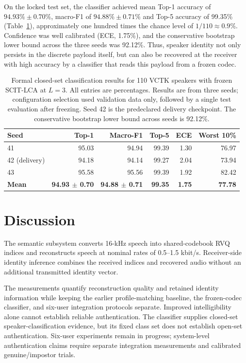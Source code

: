 \documentclass[final,5p,times,twocolumn]{elsarticle}
\begin{document}
On the locked test set, the classifier achieved mean Top-1 accuracy of $94.93\%\pm0.70\%$, macro-F1 of $94.88\%\pm0.71\%$ and Top-5 accuracy of 99.35\% (Table~\ref{tab:speaker}), approximately one hundred times the chance level of $1/110\approx0.9\%$. Confidence was well calibrated (ECE, 1.75\%), and the conservative bootstrap lower bound across the three seeds was 92.12\%. Thus, speaker identity not only persists in the discrete payload itself, but can also be recovered at the receiver with high accuracy by a classifier that reads this payload from a frozen codec.

\begin{table}[t]
\centering
\caption{Formal closed-set classification results for 110 VCTK speakers with frozen SCIT-LCA at $L=3$. All entries are percentages. Results are from three seeds; configuration selection used validation data only, followed by a single test evaluation after freezing. Seed 42 is the predeclared delivery checkpoint. The conservative bootstrap lower bound across seeds is 92.12\%.}
\label{tab:speaker}
\scriptsize\setlength{\tabcolsep}{2pt}
\begin{tabular}{lrrrrr}
\toprule
Seed & Top-1 & Macro-F1 & Top-5 & ECE & Worst 10\%\\
\midrule
41 & 95.03 & 94.94 & 99.39 & 1.30 & 76.97\\
42 (delivery) & 94.18 & 94.14 & 99.27 & 2.04 & 73.94\\
43 & 95.58 & 95.56 & 99.39 & 1.92 & 82.42\\
\textbf{Mean} & \textbf{94.93 $\pm$ 0.70} & \textbf{94.88 $\pm$ 0.71} & \textbf{99.35} & \textbf{1.75} & \textbf{77.78}\\
\bottomrule
\end{tabular}
\end{table}

\section{Discussion}
The semantic subsystem converts 16-kHz speech into shared-codebook RVQ indices and reconstructs speech at nominal rates of 0.5--1.5 kbit/s. Receiver-side identity inference combines the received indices and recovered audio without an additional transmitted identity vector.

The measurements quantify reconstruction quality and retained identity information while keeping the earlier profile-matching baseline, the frozen-codec classifier, and six-user integration protocols separate. Improved intelligibility alone cannot establish reliable authentication. The classifier supplies closed-set speaker-classification evidence, but its fixed class set does not establish open-set authentication. Six-user experiments remain in progress; system-level authentication claims require separate integration measurements and calibrated genuine/impostor trials.
\end{document}
